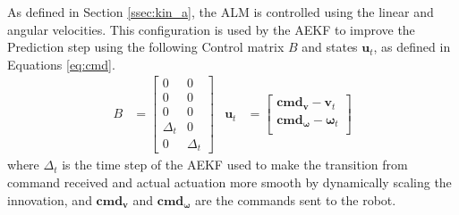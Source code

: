 As defined in Section \ref{ssec:kin_a}, the \gls{ALM} is controlled using the linear and angular velocities.
This configuration is used by the \gls{AEKF} to improve the Prediction step using the following Control matrix $B$ and states $\mathbf{u}_t$, as defined in Equations \eqref{eq:cmd}.
\begin{align}
	\label{eq:cmd}
	B &=
	\begin{bmatrix}
		0 & 0 \\
		0 & 0\\
		0 & 0\\
		\Delta_t & 0\\
		0 & \Delta_t
	\end{bmatrix}
	&
	\mathbf{u}_t &=
	\begin{bmatrix}
		\textbf{cmd}_{\mathbf{v}} - \mathbf{v}_t  \\
		\textbf{cmd}_{\boldsymbol \omega} - \boldsymbol \omega_t \\[0.3em]
	\end{bmatrix}
\end{align}
where $\Delta_t$ is the time step of the \gls{AEKF} used to make the transition from command received and actual actuation more smooth by dynamically scaling the innovation, and $\textbf{cmd}_{\mathbf{v}}$ and  $\textbf{cmd}_{\boldsymbol \omega}$ are the commands sent to the robot. %



